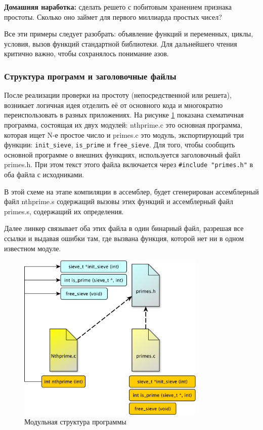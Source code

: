 \documentclass[a4paper,12pt,oneside]{article}
\begin{document}
\textbf{Домашняя наработка:} сделать решето с побитовым хранением признака простоты. Сколько оно займет для первого миллиарда простых чисел?

Все эти примеры следует разобрать: объявление функций и переменных, циклы, условия, вызов функций стандартной библиотеки. Для дальнейшего чтения критично важно, чтобы сохранялось понимание азов.

\subsubsection{Структура программ и заголовочные файлы}\label{ProgramStructure}

После реализации проверки на простоту (непосредственной или решета), возникает логичная идея отделить её от основного кода и многократно переиспользовать в разных приложениях. На рисунке \ref{fig:module_struct} показана схематичная программа, состоящая их двух модулей: nthprime.c это основная программа, которая ищет N-е простое число и primes.c это модуль, экспортирующий три функции: \lstinline!init_sieve!, \lstinline!is_prime! и \lstinline!free_sieve!. Для того, чтобы сообщить основной программе о внешних функциях, используется заголовочный файл primes.h. При этом текст этого файла включается через \lstinline!#include "primes.h"! в оба файла с исходниками.

В этой схеме на этапе компиляции в ассемблер, будет сгенерирован ассемблерный файл nthprime.s содержащий вызовы этих функций и ассемблерный файл primes.s, содержащий их определения.

Далее линкер связывает оба этих файла в один бинарный файл, разрешая все ссылки и выдавая ошибки там, где вызвана функция, которой нет ни в одном известном модуле.

\begin{figure}[h!]
\centering
\includegraphics[width=0.8\textwidth]{illustrations/module-structure-crop.pdf}
\caption{Модульная структура программы}
\label{fig:module_struct}
\end{figure}
\end{document}
